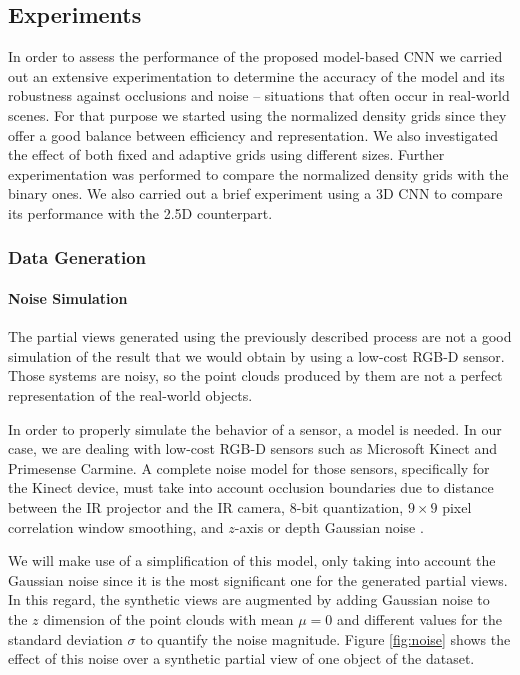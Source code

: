\subsection{Experiments}
\label{cha:objrecog:sec:study:subsec:experiments}

In order to assess the performance of the proposed model-based \acs{CNN} we carried out an extensive experimentation to determine the accuracy of the model and its robustness against occlusions and noise -- situations that often occur in real-world scenes. For that purpose we started using the normalized density grids since they offer a good balance between efficiency and representation. We also investigated the effect of both fixed and adaptive grids using different sizes. Further experimentation was performed to compare the normalized density grids with the binary ones. We also carried out a brief experiment using a \acs{3D} \acs{CNN} to compare its performance with the \acs{2.5D} counterpart.

\subsubsection{Data Generation}
\label{cha:objrecog:sec:study:subsec:experiments:subsubsec:data}

\paragraph{Noise Simulation}

The partial views generated using the previously described process are not a good simulation of the result that we would obtain by using a low-cost \acs{RGB-D} sensor. Those systems are noisy, so the point clouds produced by them are not a perfect representation of the real-world objects.

In order to properly simulate the behavior of a sensor, a model is needed. In our case, we are dealing with low-cost \acs{RGB-D} sensors such as Microsoft Kinect and Primesense Carmine. A complete noise model for those sensors, specifically for the Kinect device, must take into account occlusion boundaries due to distance between the \ac{IR} projector and the \ac{IR} camera, $8$-bit quantization, $9\times9$ pixel correlation window smoothing, and $z$-axis or depth Gaussian noise \cite{Gschwandtner2011}.

We will make use of a simplification of this model, only taking into account the Gaussian noise since it is the most significant one for the generated partial views. In this regard, the synthetic views are augmented by adding Gaussian noise to the $z$ dimension of the point clouds with mean $\mu=0$ and different values for the standard deviation $\sigma$ to quantify the noise magnitude. Figure \ref{fig:noise} shows the effect of this noise over a synthetic partial view of one object of the dataset.

